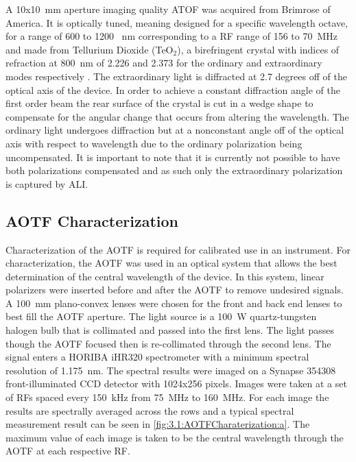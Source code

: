 \documentclass[12pt]{article}
\begin{document}
A 10x10~mm aperture imaging quality ATOF was acquired from Brimrose of America. It is optically tuned, meaning designed for a specific wavelength octave, for a range of 600 to 1200~ nm corresponding to a RF range of 156 to 70~MHz and made from Tellurium Dioxide (TeO$_{2}$), a birefringent crystal with indices of refraction at 800~nm of 2.226 and 2.373 for the ordinary and extraordinary modes respectively \citep{Uchida1971}. The extraordinary light is diffracted at 2.7 degrees off of the optical axis of the device. In order to achieve a constant diffraction angle of the first order beam the rear surface of the crystal is cut in a wedge shape to compensate for the angular change that occurs from altering the wavelength. The ordinary light undergoes diffraction but at a nonconstant angle off of the optical axis with respect to wavelength due to the ordinary polarization being uncompensated. It is important to note that it is currently not possible to have both polarizations compensated and as such only the extraordinary polarization is captured by ALI.

\subsection{AOTF Characterization}

Characterization of the AOTF is required for calibrated use in an instrument. For characterization, the AOTF was used in an optical system that allows the best determination of the central wavelength of the device. In this system, linear polarizers were inserted before and after the AOTF to remove undesired signals. A 100~mm plano-convex lenses were chosen for the front and back end lenses to best fill the AOTF aperture. The light source is a 100~W quartz-tungsten halogen bulb that is collimated and passed into the first lens. The light passes though the AOTF focused then is re-collimated through the second lens. The signal enters a HORIBA iHR320 spectrometer with a minimum spectral resolution of 1.175~nm. The spectral results were imaged on a Synapse 354308 front-illuminated CCD detector with 1024x256 pixels. Images were taken at a set of RFs spaced every 150~kHz from 75~MHz to 160~MHz. For each image the results are spectrally averaged across the rows and a typical spectral measurement result can be seen in \autoref{fig:3.1:AOTFCharaterization:a}. The maximum value of each image is taken to be the central wavelength through the AOTF at each respective RF.
\end{document}
